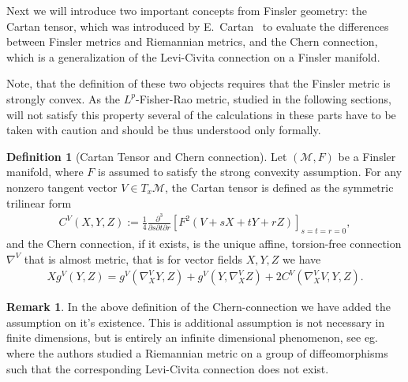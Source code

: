 \documentclass[11pt]{amsart}
\theoremstyle{definition}
\newtheorem{definition}[theorem]{Definition}
\newtheorem{remark}[theorem]{Remark}
\begin{document}
Next we will introduce two important concepts from Finsler geometry: 
 the Cartan tensor, which was introduced by E.~Cartan~\cite{cartan1934espaces} to evaluate the differences between Finsler metrics and Riemannian metrics,  and the Chern connection, which is a generalization of the Levi-Civita connection on a Finsler manifold.

Note, that the definition of these two objects requires that the Finsler metric is strongly convex. As the $L^p$-Fisher-Rao metric, studied in the following sections, will not satisfy this property several of the calculations in these parts have to be taken with caution and should be thus  understood only formally. 
\begin{definition}[Cartan Tensor and Chern connection]
Let $(\mathcal M, F)$ be a Finsler manifold, where $F$ is assumed to satisfy the strong convexity assumption. For any nonzero tangent vector $V\in T_x\mathcal M$, the Cartan tensor is defined as the symmetric trilinear form
\begin{align*}
C^V(X,Y,Z):=\frac{1}{4}\frac{\partial^3}{\partial s\partial t\partial r}\left[F^2(V+sX+tY+rZ)\right]_{s=t=r=0},
\end{align*}
and the Chern connection, if it exists, is the unique affine, torsion-free connection $\nabla^V$ that
is almost metric, that is for vector fields $X,Y,Z$ we have
\begin{align*}\label{almost_metric}
X g^V(Y,Z)= g^V(\nabla^V_X Y,Z)+g^V(Y,\nabla^V_X Z)+2C^V(\nabla^V_X V,Y,Z).
\end{align*}
\end{definition}
\begin{remark}
In the above definition of the Chern-connection we have added the assumption on it's existence. This is additional assumption is not necessary in finite dimensions, but is entirely an infinite dimensional phenomenon, see eg.~\cite{bauer2014homogeneous} where the authors studied a Riemannian metric on a group of diffeomorphisms such that the corresponding Levi-Civita connection does not exist. 
\end{remark}
\end{document}
